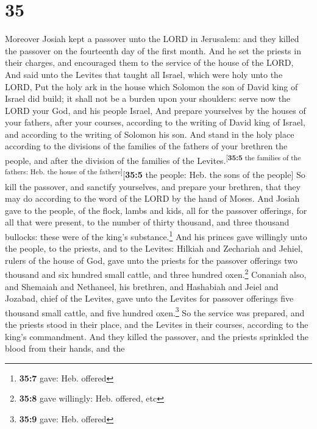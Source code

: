 \hypertarget{section-34}{%
\section{35}\label{section-34}}

 Moreover Josiah kept a passover unto the LORD in
Jerusalem: and they killed the passover on the fourteenth day of the
first month.  And he set the priests in their charges, and
encouraged them to the service of the house of the LORD, 
And said unto the Levites that taught all Israel, which were holy unto
the LORD, Put the holy ark in the house which Solomon the son of David
king of Israel did build; it shall not be a burden upon your shoulders:
serve now the LORD your God, and his people Israel,  And
prepare yourselves by the houses of your fathers, after your courses,
according to the writing of David king of Israel, and according to the
writing of Solomon his son.  And stand in the holy place
according to the divisions of the families of the fathers of your
brethren the people, and after the division of the families of the
Levites.\textsuperscript{{[}\textbf{35:5} the families of the fathers:
Heb. the house of the fathers{]}}{[}\textbf{35:5} the people: Heb. the
sons of the people{]}  So kill the passover, and sanctify
yourselves, and prepare your brethren, that they may do according to the
word of the LORD by the hand of Moses.  And Josiah gave to
the people, of the flock, lambs and kids, all for the passover
offerings, for all that were present, to the number of thirty thousand,
and three thousand bullocks: these were of the king's
substance.\footnote{\textbf{35:7} gave: Heb. offered}  And
his princes gave willingly unto the people, to the priests, and to the
Levites: Hilkiah and Zechariah and Jehiel, rulers of the house of God,
gave unto the priests for the passover offerings two thousand and six
hundred small cattle, and three hundred oxen.\footnote{\textbf{35:8}
  gave willingly: Heb. offered, etc}  Conaniah also, and
Shemaiah and Nethaneel, his brethren, and Hashabiah and Jeiel and
Jozabad, chief of the Levites, gave unto the Levites for passover
offerings five thousand small cattle, and five hundred oxen.\footnote{\textbf{35:9}
  gave: Heb. offered}  So the service was prepared, and
the priests stood in their place, and the Levites in their courses,
according to the king's commandment.  And they killed the
passover, and the priests sprinkled the blood from their hands, and the
